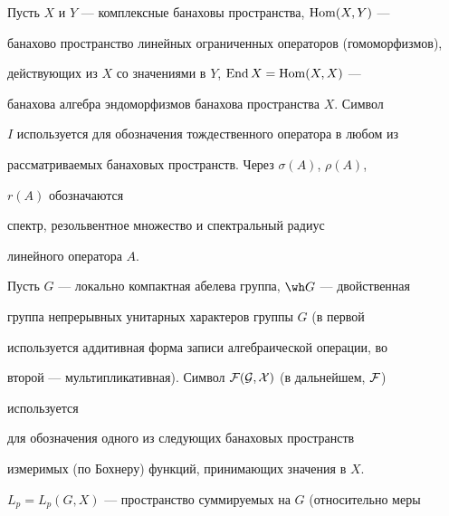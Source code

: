  


\date{} 




\pagestyle{plain} %


 




\maketitle 


\label{begin} 


 


Пусть $X$ и $Y$ --- комплексные банаховы пространства, $\operatorname{Hom}(X,Y)$ --- 


банахово пространство линейных ограниченных операторов (гомоморфизмов), 


действующих из $X$ со значениями в $Y$, $\operatorname{End} X=\operatorname{Hom}(X,X)$ --- 


банахова алгебра эндоморфизмов банахова пространства $X$. Символ 


$I$ используется для обозначения тождественного оператора в любом из 


рассматриваемых банаховых пространств. Через $\sigma(A)$, $\rho(A)$, 


$r(A)$ обозначаются 


спектр, резольвентное множество и спектральный радиус 


линейного оператора $A$. 


 


Пусть $G$ --- локально компактная абелева группа, $\wh G$ --- двойственная 


группа непрерывных унитарных характеров группы $G$ (в первой 


используется аддитивная форма записи алгебраической операции, во 


второй --- мультипликативная). Символ $\cal F(G,X)$ (в дальнейшем, $\cal F$) 


используется 


для обозначения одного из следующих банаховых пространств 


измеримых (по Бохнеру) функций, принимающих значения в $X$.


 


$L_p=L_p(G,X)$ --- пространство суммируемых на $G$ (относительно меры 


